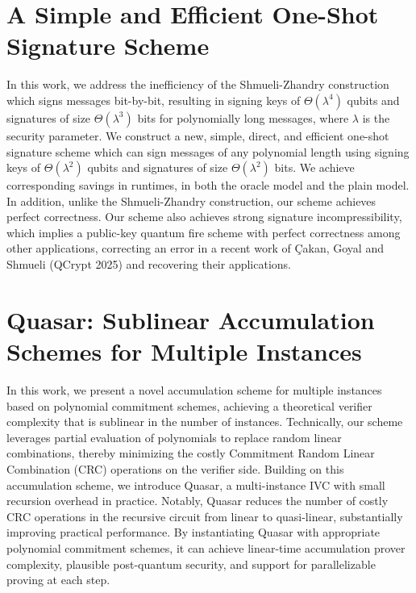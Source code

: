 \documentclass[11pt,oneside]{book}
\theoremstyle{definition}
\theoremstyle{remark}
\theoremstyle{plain}
\begin{document}
\section{\cite{cryptoeprint:2025/1906} A Simple and Efficient One-Shot Signature Scheme}
In this work, we address the inefficiency of the Shmueli-Zhandry construction which signs messages bit-by-bit, resulting in signing keys of $\Theta(\lambda^4)$ qubits and signatures of size $\Theta(\lambda^3)$ bits for polynomially long messages, where $\lambda$ is the security parameter. We construct a new, simple, direct, and efficient one-shot signature scheme which can sign messages of any polynomial length using signing keys of $\Theta(\lambda^2)$ qubits and signatures of size $\Theta(\lambda^2)$ bits. We achieve corresponding savings in runtimes, in both the oracle model and the plain model. In addition, unlike the Shmueli-Zhandry construction, our scheme achieves perfect correctness. Our scheme also achieves strong signature incompressibility, which implies a public-key quantum fire scheme with perfect correctness among other applications, correcting an error in a recent work of Çakan, Goyal and Shmueli (QCrypt 2025) and recovering their applications.

\section{\cite{cryptoeprint:2025/1912} Quasar: Sublinear Accumulation Schemes for Multiple Instances}
In this work, we present a novel accumulation scheme for multiple instances based on polynomial commitment schemes, achieving a theoretical verifier complexity that is sublinear in the number of instances. Technically, our scheme leverages partial evaluation of polynomials to replace random linear combinations, thereby minimizing the costly Commitment Random Linear Combination (CRC) operations on the verifier side. Building on this accumulation scheme, we introduce Quasar, a multi-instance IVC with small recursion overhead in practice.
Notably, Quasar reduces the number of costly CRC operations in the recursive circuit from linear to quasi-linear, substantially improving practical performance. By instantiating Quasar with appropriate polynomial commitment schemes, it can achieve linear-time accumulation prover complexity, plausible post-quantum security, and support for parallelizable proving at each step.
\end{document}

